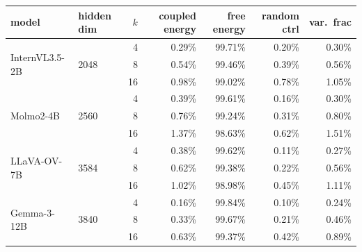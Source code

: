 \small
\setlength{\tabcolsep}{4pt}
\begin{tabular}{@{}llrrrrr@{}}
\toprule
model & hidden dim & $k$ & coupled energy & free energy & random ctrl & var.\ frac \\
\midrule
\multirow{3}{*}{InternVL3.5-2B} & \multirow{3}{*}{2048} & 4 & 0.29\% & 99.71\% & 0.20\% & 0.30\% \\
 & & 8 & 0.54\% & 99.46\% & 0.39\% & 0.56\% \\
 & & 16 & 0.98\% & 99.02\% & 0.78\% & 1.05\% \\
\midrule
\multirow{3}{*}{Molmo2-4B} & \multirow{3}{*}{2560} & 4 & 0.39\% & 99.61\% & 0.16\% & 0.30\% \\
 & & 8 & 0.76\% & 99.24\% & 0.31\% & 0.80\% \\
 & & 16 & 1.37\% & 98.63\% & 0.62\% & 1.51\% \\
\midrule
\multirow{3}{*}{LLaVA-OV-7B} & \multirow{3}{*}{3584} & 4 & 0.38\% & 99.62\% & 0.11\% & 0.27\% \\
 & & 8 & 0.62\% & 99.38\% & 0.22\% & 0.56\% \\
 & & 16 & 1.02\% & 98.98\% & 0.45\% & 1.11\% \\
\midrule
\multirow{3}{*}{Gemma-3-12B} & \multirow{3}{*}{3840} & 4 & 0.16\% & 99.84\% & 0.10\% & 0.24\% \\
 & & 8 & 0.33\% & 99.67\% & 0.21\% & 0.46\% \\
 & & 16 & 0.63\% & 99.37\% & 0.42\% & 0.89\% \\
\bottomrule
\end{tabular}

